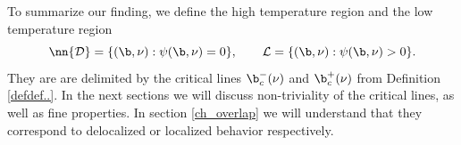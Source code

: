 To summarize our finding, we define the  high temperature region and the  low temperature region
\begin{equation} \nn
{\cal D} = \{ (\b,\nu): \psi(\b, \nu)=0 \}, \qquad {\cal L}  = \{ (\b,\nu): \psi(\b, \nu)>0\}.
\end{equation}
They are are delimited by the critical lines $\b_c^-(\nu)$ and $\b_c^+(\nu)$ from Definition \ref{defdef..}.
In the next sections we will discuss non-triviality of the critical lines, as well as fine properties. In section \ref{ch_overlap} we will understand that they correspond to delocalized  or localized
behavior respectively.





